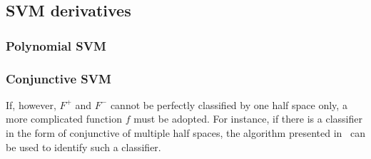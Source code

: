 \subsection{SVM derivatives}

\subsubsection{Polynomial SVM}

\subsubsection{Conjunctive SVM}


If, however, $F^+$ and $F^-$ cannot be perfectly classified by one half space only, 
a more complicated function $f$ must be adopted. 
For instance, if there is a classifier in the form of conjunctive of multiple half spaces, 
the algorithm presented in~\cite{Sharma2012} can be used to identify such a classifier.




